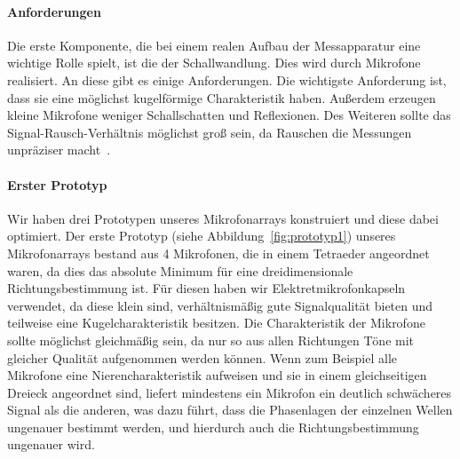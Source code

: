 \paragraph{Anforderungen}
Die erste Komponente, die bei einem realen Aufbau der Messapparatur eine wichtige Rolle spielt, ist die der Schallwandlung. Dies wird durch Mikrofone realisiert. An diese gibt es einige Anforderungen. Die wichtigste Anforderung ist, dass sie eine möglichst kugelförmige Charakteristik haben.
Außerdem erzeugen kleine Mikrofone weniger Schallschatten und Reflexionen. Des Weiteren sollte das Signal-Rausch-Verhältnis möglichst groß sein, da Rauschen die Messungen unpräziser macht~\cite{Rausch}.

\paragraph{Erster Prototyp}
Wir haben drei Prototypen unseres Mikrofonarrays konstruiert und diese dabei optimiert. Der erste Prototyp (siehe Abbildung~\ref{fig:prototyp1}) unseres Mikrofonarrays bestand aus 4 Mikrofonen, die in einem Tetraeder angeordnet waren, da dies das absolute Minimum für eine dreidimensionale Richtungsbestimmung ist. Für diesen haben wir Elektretmikrofonkapseln verwendet, da diese klein sind, verhältnismäßig gute Signalqualität bieten und teilweise eine Kugelcharakteristik besitzen.
Die Charakteristik der Mikrofone sollte möglichst gleichmäßig sein, da nur so aus allen Richtungen Töne mit gleicher Qualität aufgenommen werden können. Wenn zum Beispiel alle Mikrofone eine Nierencharakteristik aufweisen und sie in einem gleichseitigen Dreieck angeordnet sind, liefert mindestens ein Mikrofon ein deutlich schwächeres Signal als die anderen, was dazu führt, dass die Phasenlagen der einzelnen Wellen ungenauer bestimmt werden, und hierdurch auch die Richtungsbestimmung ungenauer wird.

